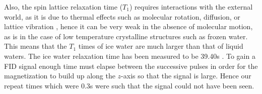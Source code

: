 Also, the spin lattice relaxation time ($T_1$) requires interactions with the external world, as it is due to thermal effects such as molecular rotation, diffusion, or lattice vibration \cite{fukushima1981experimental}, hence it can be very weak in the absence of molecular motion, as is in the case of low temperature crystalline structures such as frozen water. This means that the $T_1$ times of ice water are much larger than that of liquid waters. The ice water relaxation time has been measured to be 39.40s \cite{le2000study}. To gain a FID signal enough time must elapse between the successive pulses in order for the magnetization to build up along the $z$-axis so that the signal is large. Hence our repeat times which were 0.3s were such that the signal could not have been seen. 



